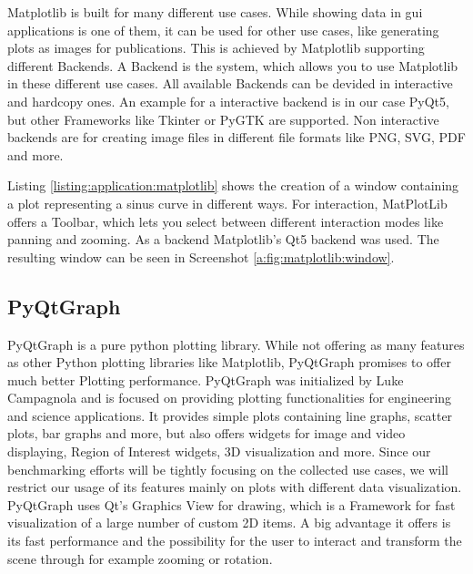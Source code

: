 Matplotlib is built for many different use cases. While showing data in \gls{gui} applications is one of them, it can be used for other use cases, like generating plots as images for publications. This is achieved by Matplotlib supporting different Backends. A Backend is the system, which allows you to use Matplotlib in these different use cases. All available Backends can be devided in interactive and hardcopy ones. An example for a interactive backend is in our case PyQt5, but other Frameworks like Tkinter or PyGTK are supported. Non interactive backends are for creating image files in different file formats like PNG, SVG, PDF and more.
\cite{MatplotlibIntro, PythonDataVis}

Listing \ref{listing:application:matplotlib} shows the creation of a window containing a plot representing a sinus curve in different ways. For interaction, MatPlotLib offers a Toolbar, which lets you select between different interaction modes like panning and zooming. As a backend Matplotlib's Qt5 backend was used. The resulting window can be seen in Screenshot \ref{a:fig:matplotlib:window}.



\subsection{PyQtGraph}
\label{sec:application:libraries:pyqtgraph}

PyQtGraph is a pure python plotting library. While not offering as many features as other Python plotting libraries like Matplotlib, PyQtGraph promises to offer much better Plotting performance. PyQtGraph was initialized by Luke Campagnola and is focused on providing plotting functionalities for engineering and science applications. It provides simple plots containing line graphs, scatter plots, bar graphs and more, but also offers widgets for image and video displaying, Region of Interest widgets, 3D visualization and more. Since our benchmarking efforts will be tightly focusing on the collected use cases, we will restrict our usage of its features mainly on plots with different data visualization. PyQtGraph uses Qt's Graphics View for drawing, which is a Framework for fast visualization of a large number of custom 2D items. A big advantage it offers is its fast performance and the possibility for the user to interact and transform the scene through for example zooming or rotation. \cite{GraphicsView}

